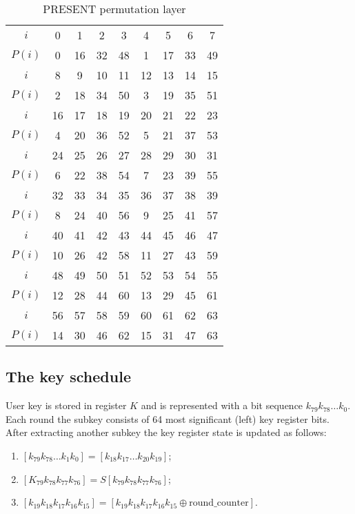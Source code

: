 \begin{table}[p]
    \centering
    \caption{PRESENT permutation layer}
    \small
    \label{tbl:player}
    \begin{tabular}{|c||c|c|c|c|c|c|c|c|}
        \hline
        $ i $  & 0  & 1  & 2  & 3  & 4 & 5  & 6  & 7  \\[-0.8ex]
        $P(i)$ & 0  & 16 & 32 & 48 & 1 & 17 & 33 & 49 \\
        \hline
        $ i $  & 8 & 9  & 10 & 11 & 12 & 13 & 14 & 15 \\[-0.8ex] 
        $P(i)$ & 2 & 18 & 34 & 50 & 3  & 19 & 35 & 51 \\ 
        \hline

        $ i $  & 16 & 17 & 18 & 19 & 20 & 21 & 22 & 23 \\[-0.8ex]
        $P(i)$ & 4  & 20 & 36 & 52 & 5  & 21 & 37 & 53 \\
        \hline
        $ i $  & 24 & 25 & 26 & 27 & 28 & 29 & 30 & 31 \\[-0.8ex]
        $P(i)$ & 6  & 22 & 38 & 54 & 7  & 23 & 39 & 55 \\ 
        \hline

        $ i $  & 32 & 33 & 34 & 35 & 36 & 37 & 38 & 39 \\[-0.8ex] 
        $P(i)$ & 8  & 24 & 40 & 56 & 9  & 25 & 41 & 57 \\
        \hline
        $ i $  &  40 & 41 & 42 & 43 & 44 & 45 & 46 & 47 \\ [-0.8ex] 
        $P(i)$ &  10 & 26 & 42 & 58 & 11 & 27 & 43 & 59 \\ 
        \hline
        $ i $  & 48 & 49 & 50 & 51 & 52 & 53 & 54 & 55 \\[-0.8ex] 
        $P(i)$ & 12 & 28 & 44 & 60 & 13 & 29 & 45 & 61 \\
        \hline
        $ i $  & 56 & 57 & 58 & 59 & 60 & 61 & 62 & 63 \\ [-0.8ex] 
        $P(i)$ & 14 & 30 & 46 & 62 & 15 & 31 & 47 & 63 \\     
        \hline
    \end{tabular}
\end{table}

\subsection{The key schedule}

User key is stored in register $ K $ and is represented with a bit sequence
$ k_{79} k_{78} \hdots k_0 $. Each round the subkey consists of 64 most
significant (left) key register bits. After extracting another subkey the key
register state is updated as follows:
\begin{enumerate}
    \setlength{\itemsep}{1pt}
        \setlength{\parskip}{0pt}
        \setlength{\parsep}{0pt}
    \item $ [k_{79} k_{78} \hdots k_1 k_0] = [k_{18} k_{17} \hdots k_{20} k_{19}] $;
    \item $ [K_{79} k_{78} k_{77} k_{76}] = S[k_{79} k_{78} k_{77} k_{76}] $;
    \item $ [k_{19} k_{18} k_{17} k_{16} k_{15}] = [k_{19} k_{18} k_{17} k_{16}
        k_{15} \oplus \text{round\_counter}] $.
\end{enumerate}

